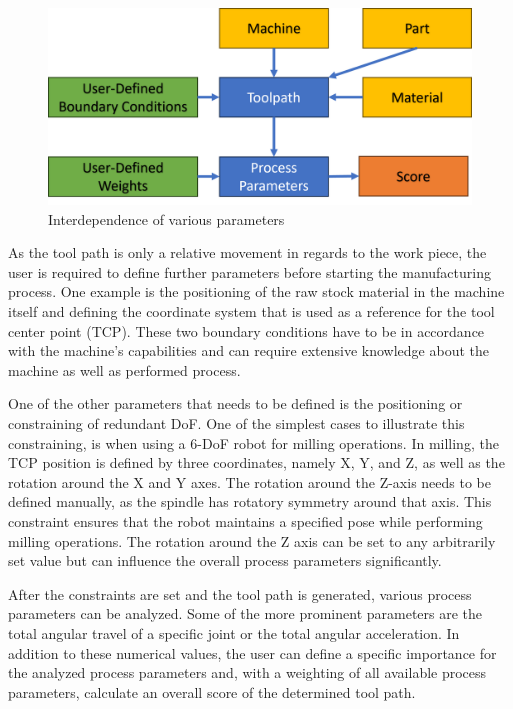 \begin{figure}[H]
	\centerline{\includegraphics[scale=.65]{figures/BasicScore.png}}
	\caption{Interdependence of various parameters}
	\label{BasicScore}
\end{figure}

As the tool path is only a relative movement in regards to the work piece, the user is required to define further parameters before starting the manufacturing process. One example is the positioning of the raw stock material in the machine itself and defining the coordinate system that is used as a reference for the tool center point (TCP). These two boundary conditions have to be in accordance with the  machine's capabilities and can require extensive knowledge about the machine as well as performed process.

One of the other parameters that needs to be defined is the positioning or constraining of redundant DoF. One of the simplest cases to illustrate this constraining, is when using a 6-DoF robot for milling operations. In milling, the TCP position is defined by three coordinates, namely X, Y, and Z, as well as the rotation around the X and Y axes. The rotation around the Z-axis needs to be defined manually, as the spindle has rotatory symmetry around that axis. This constraint ensures that the robot maintains a specified pose while performing milling operations. The rotation around the Z axis can be set to any arbitrarily set value but can influence the overall process parameters significantly. 

After the constraints are set and the tool path is generated, various process parameters can be analyzed. Some of the more prominent parameters are the total angular travel of a specific joint or the total angular acceleration. In addition to these numerical values, the user can define a specific importance for the analyzed process parameters and, with a weighting of all available process parameters, calculate an overall score of the determined tool path.



